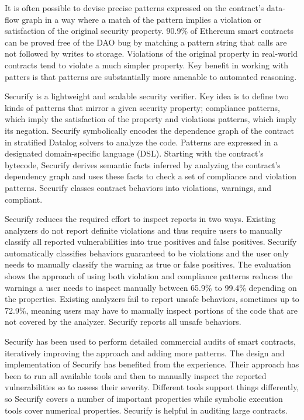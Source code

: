 \documentclass{article}
\begin{document}
It is often possible to devise precise patterns expressed on the contract's data-flow graph in a way where a match of the pattern implies a violation or satisfaction of the original security property. 90.9\% of Ethereum smart contracts can be proved free of the DAO bug by matching a pattern string that calls are not followed by writes to storage. Violations of the original property in real-world contracts tend to violate a much simpler property. Key benefit in working with patters is that patterns are substantially more amenable to automated reasoning.

Securify is a lightweight and scalable security verifier. Key idea is to define two kinds of patterns that mirror a given security property; compliance patterns, which imply the satisfaction of the property and violations patterns, which imply its negation. Securify symbolically encodes the dependence graph of the contract in stratified Datalog solvers to analyze the code. Patterns are expressed in a designated domain-specific language (DSL). Starting with the contract's bytecode, Securify derives semantic facts inferred by analyzing the contract's dependency graph and uses these facts to check a set of compliance and violation patterns. Securify classes contract behaviors into violations, warnings, and compliant. 

Securify reduces the required effort to inspect reports in two ways. Existing analyzers do not report definite violations and thus require users to manually classify all reported vulnerabilities into true positives and false positives. Securify automatically classifies behaviors guaranteed to be violations and the user only needs to manually classify the warning as true or false positives. The evaluation shows the approach of using both violation and compliance patterns reduces the warnings a user needs to inspect manually between 65.9\% to 99.4\% depending on the properties. Existing analyzers fail to report unsafe behaviors, sometimes up to 72.9\%, meaning users may have to manually inspect portions of the code that are not covered by the analyzer. Securify reports all unsafe behaviors.

Securify has been used to perform detailed commercial audits of smart contracts, iteratively improving the approach and adding more patterns. The design and implementation of Securify has benefited from the experience. Their approach has been to run all available tools and then to manually inspect the reported vulnerabilities so to assess their severity. Different tools support things differently, so Securify covers a number of important properties while symbolic execution tools cover numerical properties. Securify is helpful in auditing large contracts.
\end{document}
